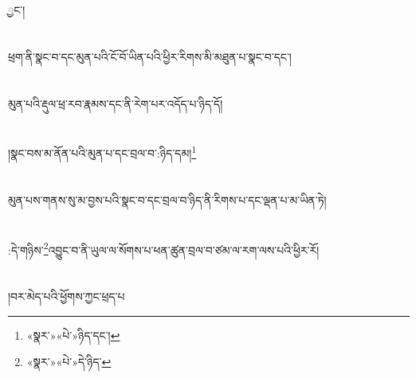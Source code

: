 ྱང་།\chapter{ }ཕྲག་ནི་སྣང་བ་དང་མུན་པའི་ངོ་བོ་ཡིན་པའི་ཕྱིར་རིགས་མི་མཐུན་པ་སྣང་བ་དང་།\chapter{ }མུན་པའི་རྡུལ་ཕྲ་རབ་རྣམས་དང་ནི་རེག་པར་འདོད་པ་ཉིད་དོ།\chapter{ }།སྣང་བས་མ་ནོན་པའི་མུན་པ་དང་བྲལ་བ་:ཉིད་དམ།\footnote{«སྣར་»«པེ་»ཉིད་དང་།}\chapter{ }མུན་པས་གནས་སུ་མ་བྱས་པའི་སྣང་བ་དང་བྲལ་བ་ཉིད་ནི་རིགས་པ་དང་ལྡན་པ་མ་ཡིན་ཏེ།\chapter{ }:དེ་གཉིས་\footnote{«སྣར་»«པེ་»དེ་ཉིད་}འབྱུང་བ་ནི་ཡུལ་ལ་སོགས་པ་ཕན་ཚུན་བྲལ་བ་ཙམ་ལ་རག་ལས་པའི་ཕྱིར་རོ།\chapter{ }།བར་མེད་པའི་ཕྱོགས་ཀྱང་ཕྲད་པ